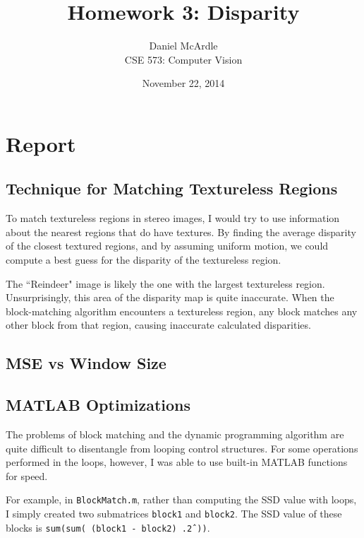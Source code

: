 \documentclass[12pt]{article}
\begin{document}
\title{Homework 3: Disparity}
\author{Daniel McArdle\\
CSE 573: Computer Vision}
\date{November 22, 2014}
\maketitle  %


\section{Report}

\subsection{Technique for Matching Textureless Regions}

To match textureless regions in stereo images, I would try to use information
about the nearest regions that do have textures. By finding the average
disparity of the closest textured regions, and by assuming uniform motion, we
could compute a best guess for the disparity of the textureless region.

The ``Reindeer" image is likely the one with the largest textureless region.
Unsurprisingly, this area of the disparity map is quite inaccurate.  When the
block-matching algorithm encounters a textureless region, any block matches any
other block from that region, causing inaccurate calculated disparities.

\subsection{MSE vs Window Size}

\subsection{MATLAB Optimizations}

The problems of block matching and the dynamic programming algorithm are quite
difficult to disentangle from looping control structures. For some operations
performed in the loops, however, I was able to use built-in MATLAB functions
for speed.

For example, in \texttt{BlockMatch.m}, rather than computing the SSD value with
loops, I simply created two submatrices \texttt{block1} and \texttt{block2}.
The SSD value of these blocks is \texttt{sum(sum( (block1 - block2) .\^ 2 ))}.
\end{document}
